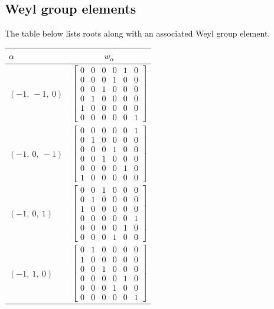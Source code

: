 \documentclass[11pt]{article}
\newcommand{\noi}{\noindent}
\theoremstyle{definition}
\begin{document}
\subsection{Weyl group elements}

\noi The table below lists roots along with an associated Weyl group element.

\bigskip

\noi \noindent \begin{longtable}{|l|c|}
    \hline
    $\alpha$ & $w_\alpha$ \\
    \hline
    \endhead
    $\left( -1, \  -1, \  0\right)$ & ${\left[\begin{matrix}0 & 0 & 0 & 0 & 1 & 0\\0 & 0 & 0 & 1 & 0 & 0\\0 & 0 & 1 & 0 & 0 & 0\\0 & 1 & 0 & 0 & 0 & 0\\1 & 0 & 0 & 0 & 0 & 0\\0 & 0 & 0 & 0 & 0 & 1\end{matrix}\right]}$ \\
    \hline
    $\left( -1, \  0, \  -1\right)$ & ${\left[\begin{matrix}0 & 0 & 0 & 0 & 0 & 1\\0 & 1 & 0 & 0 & 0 & 0\\0 & 0 & 0 & 1 & 0 & 0\\0 & 0 & 1 & 0 & 0 & 0\\0 & 0 & 0 & 0 & 1 & 0\\1 & 0 & 0 & 0 & 0 & 0\end{matrix}\right]}$ \\
    \hline
    $\left( -1, \  0, \  1\right)$ & ${\left[\begin{matrix}0 & 0 & 1 & 0 & 0 & 0\\0 & 1 & 0 & 0 & 0 & 0\\1 & 0 & 0 & 0 & 0 & 0\\0 & 0 & 0 & 0 & 0 & 1\\0 & 0 & 0 & 0 & 1 & 0\\0 & 0 & 0 & 1 & 0 & 0\end{matrix}\right]}$ \\
    \hline
    $\left( -1, \  1, \  0\right)$ & ${\left[\begin{matrix}0 & 1 & 0 & 0 & 0 & 0\\1 & 0 & 0 & 0 & 0 & 0\\0 & 0 & 1 & 0 & 0 & 0\\0 & 0 & 0 & 0 & 1 & 0\\0 & 0 & 0 & 1 & 0 & 0\\0 & 0 & 0 & 0 & 0 & 1\end{matrix}\right]}$ \\

\end{longtable}
\end{document}
